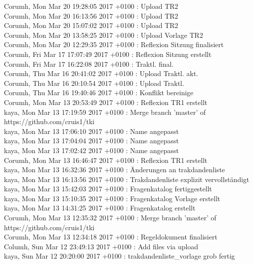 Corumh, Mon Mar 20 19:28:05 2017 +0100 : Upload TR2\\
Corumh, Mon Mar 20 16:13:56 2017 +0100 : Upload TR2\\
Corumh, Mon Mar 20 15:07:02 2017 +0100 : Upload TR2\\
Corumh, Mon Mar 20 13:58:25 2017 +0100 : Upload Vorlage TR2\\
Corumh, Mon Mar 20 12:29:35 2017 +0100 : Reflexion Sitzung finalisiert\\
Corumh, Fri Mar 17 17:07:49 2017 +0100 : Reflexion Sitzung erstellt\\
Corumh, Fri Mar 17 16:22:08 2017 +0100 : Traktl. final.\\
Corumh, Thu Mar 16 20:41:02 2017 +0100 : Upload Traktl. akt.\\
Corumh, Thu Mar 16 20:10:54 2017 +0100 : Upload Traktl.\\
Corumh, Thu Mar 16 19:40:46 2017 +0100 : Konflikt bereinige\\
Corumh, Mon Mar 13 20:53:49 2017 +0100 : Reflexion TR1 erstellt\\
kaya, Mon Mar 13 17:19:59 2017 +0100 : Merge branch 'master' of https://github.com/cruis1/tki\\
kaya, Mon Mar 13 17:06:10 2017 +0100 : Name angepasst\\
kaya, Mon Mar 13 17:04:04 2017 +0100 : Name angepasst\\
kaya, Mon Mar 13 17:02:42 2017 +0100 : Name angepasst\\
Corumh, Mon Mar 13 16:46:47 2017 +0100 : Reflexion TR1 erstellt\\
kaya, Mon Mar 13 16:32:36 2017 +0100 : Änderungen an trakdandenliste\\
kaya, Mon Mar 13 16:13:56 2017 +0100 : Trakdandenliste explizit vervollständigt\\
kaya, Mon Mar 13 15:42:03 2017 +0100 : Fragenkatalog fertiggestellt\\
kaya, Mon Mar 13 15:10:35 2017 +0100 : Fragenkatalog Vorlage erstellt\\
kaya, Mon Mar 13 14:31:25 2017 +0100 : Fragenkatalog erstellt\\
Corumh, Mon Mar 13 12:35:32 2017 +0100 : Merge branch 'master' of https://github.com/cruis1/tki\\
Corumh, Mon Mar 13 12:34:18 2017 +0100 : Regeldokument finalisiert\\
Columh, Sun Mar 12 23:49:13 2017 +0100 : Add files via upload\\
kaya, Sun Mar 12 20:20:00 2017 +0100 : trakdandenliste\_vorlage grob fertig\\
